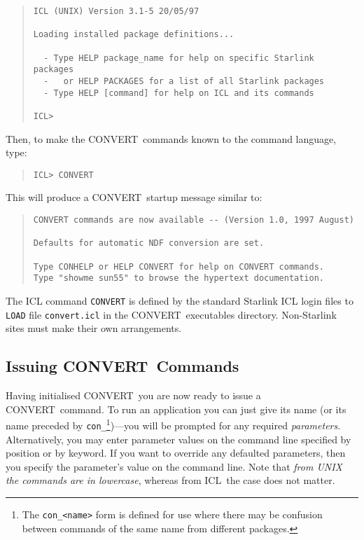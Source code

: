 \documentclass[twoside,11pt]{article}
\newcommand{\xlabel}[1]{}
\newcommand{\CONVERT}{{\footnotesize CONVERT}}
\newcommand{\BCONVERT}{{\normalsize CONVERT}}
\newcommand{\ICL}{{\footnotesize ICL}}
\begin{document}
\small
\begin{quote} \begin{verbatim}
ICL (UNIX) Version 3.1-5 20/05/97

Loading installed package definitions...

  - Type HELP package_name for help on specific Starlink packages
  -   or HELP PACKAGES for a list of all Starlink packages
  - Type HELP [command] for help on ICL and its commands

ICL>
\end{verbatim} \end{quote}
\normalsize
Then, to make the \CONVERT\ commands known to the command language, type:
\small
\begin{quote} \begin{verbatim}
ICL> CONVERT
\end{verbatim} \end{quote}
\normalsize
This will produce a \CONVERT\ startup message similar to:
\small
\begin{quote} \begin{verbatim}
CONVERT commands are now available -- (Version 1.0, 1997 August)

Defaults for automatic NDF conversion are set.

Type CONHELP or HELP CONVERT for help on CONVERT commands.
Type "showme sun55" to browse the hypertext documentation.
\end{verbatim} \end{quote}
\normalsize

The ICL command \texttt{CONVERT} is defined by the standard Starlink ICL login
files to \texttt{LOAD} file \texttt{convert.icl} in the \CONVERT\ executables 
directory. Non-Starlink sites must make their own arrangements.

\subsection[Issuing {\small CONVERT} Commands]
{\xlabel{issuing_convert_commands}
Issuing \BCONVERT\ Commands}
Having initialised \CONVERT\ you are now ready to issue a
\CONVERT\ command. To run an application you can just give
its name (or its name preceded by \texttt{con\_}\footnote{The
\texttt{con\_<name>}
form is defined for use where there may be confusion between commands of the
same name from different packages.})---you will be prompted for any required 
{\em parameters}. 
Alternatively, you may enter parameter values on the command line
specified by position or by keyword.  If you want to override any
defaulted parameters, then you specify the parameter's value on the
command line.  Note that {\em from UNIX the commands are in lowercase}, whereas
from \ICL\ the case does not matter.
\end{document}
